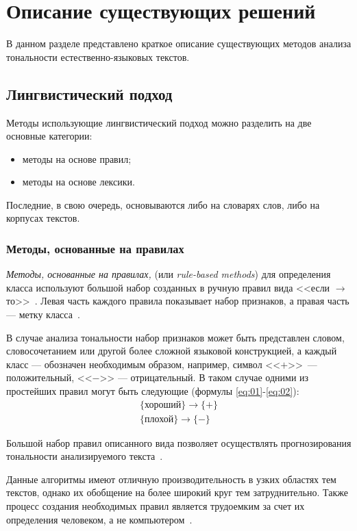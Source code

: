 \chapter{Описание существующих решений}

В данном разделе представлено краткое описание существующих методов анализа
тональности естественно-языковых текстов.

\section{Лингвистический подход}

Методы использующие лингвистический подход можно разделить на две основные
категории:
\begin{itemize}
    \item методы на основе правил;
    \item методы на основе лексики.
\end{itemize}

Последние, в свою очередь, основываются либо на словарях слов, либо на корпусах
текстов.

\subsection{Методы, основанные на правилах}

\textit{Методы, основанные на правилах,} (или \textit{rule-based methods}) для
определения класса используют большой набор созданных в ручную правил
вида <<если $\rightarrow$ то>>~\cite{article14}. Левая часть каждого правила
показывает набор признаков, а правая часть --- метку класса~\cite{article2}.

В случае анализа тональности набор признаков может быть представлен словом,
словосочетанием или другой более сложной языковой конструкцией, а каждый класс
--- обозначен необходимым образом, например, символ <<$+$>>\ --- положительный,
<<$-$>> --- отрицательный. В таком случае одними из простейших
правил могут быть следующие (формулы \ref{eq:01}-\ref{eq:02}):
\begin{eqnarray}
    \{\text{хороший}\} \rightarrow \{+\}\label{eq:01}\\
    \{\text{плохой}\} \rightarrow \{-\}\label{eq:02}
\end{eqnarray}

Большой набор правил описанного вида позволяет осуществлять
прогнозирования тональности анализируемого текста~\cite{article16}.

Данные алгоритмы имеют отличную производительность в узких
областях тем текстов, однако их обобщение на более широкий круг тем
затруднительно. Также процесс создания необходимых правил является
трудоемким за счет их определения человеком, а не компьютером~\cite{article15}.

